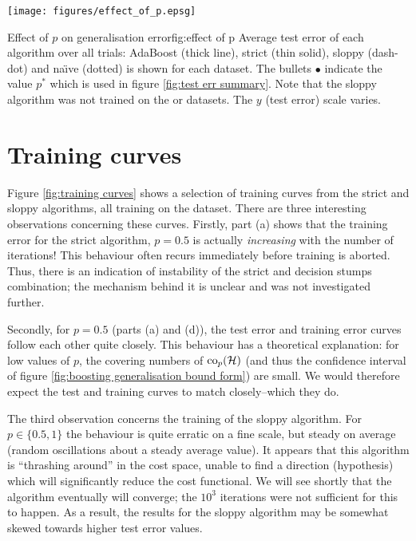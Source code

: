 \begin{linefigure}
\begin{center}
\hspace*{-1cm}\texttt{[image: figures/effect\_of\_p.epsg]}
\end{center}
\begin{capt}{Effect of $p$ on generalisation error}{fig:effect of p}
Average test error of each algorithm over all trials: AdaBoost (thick
line), strict (thin solid), sloppy (dash-dot) and na\"{\i}ve (dotted)
is shown for each dataset.  The bullets $\bullet$ indicate the value
$p^{\ast}$ which is used in figure \ref{fig:test err summary}.  Note
that the sloppy algorithm was not trained on the  or
 datasets.  The $y$ (test error) scale varies.
\end{capt}
\end{linefigure}

\section{Training curves}
\label{sec:training curves}

Figure \ref{fig:training curves} shows a selection of training curves
from the strict and sloppy algorithms, all training on the 
dataset.  There are three interesting observations concerning these
curves.  Firstly, part (a) shows that the training error for the
strict algorithm, $p=0.5$ is actually \emph{increasing} with the number
of iterations!  This behaviour often recurs immediately before
training is aborted.  Thus, there is an indication of instability of
the strict and decision stumps combination; the mechanism behind it is
unclear and was not investigated further.

Secondly, for $p=0.5$ (parts (a) and (d)), the test error and training
error curves follow each other quite closely.  This behaviour has a
theoretical explanation: for low values of $p$, the covering numbers
of $\mathrm{co}_p(\mathcal{H})$ (and thus the confidence interval of figure
\ref{fig:boosting generalisation bound form}) are small.  We would
therefore expect the test and training curves to match closely--which
they do.

The third observation concerns the training of the sloppy algorithm.
For $p \in \{0.5, 1\}$ the behaviour is quite erratic on a fine scale,
but steady on average (random oscillations about a steady average
value).  It appears that this algorithm is ``thrashing around'' in the
cost space, unable to find a direction (hypothesis) which will
significantly reduce the cost functional.  We will see shortly that
the algorithm eventually will converge; the $10^3$ iterations were not
sufficient for this to happen.  As a result, the results for the
sloppy algorithm may be somewhat skewed towards higher test error
values.

